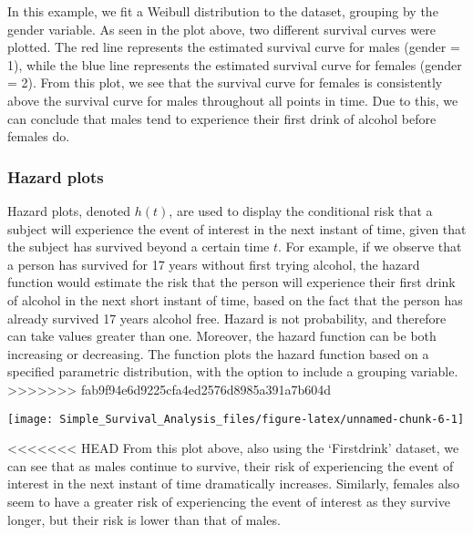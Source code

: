 In this example, we fit a Weibull distribution to the 
dataset, grouping by the gender variable. As seen in the plot above, two
different survival curves were plotted. The red line represents the
estimated survival curve for males (gender = 1), while the blue line
represents the estimated survival curve for females (gender = 2). From
this plot, we see that the survival curve for females is consistently
above the survival curve for males throughout all points in time. Due to
this, we can conclude that males tend to experience their first drink of
alcohol before females do.

\hypertarget{hazard-plots-1}{%
\subsubsection{Hazard plots}\label{hazard-plots-1}}

Hazard plots, denoted \(h(t)\), are used to display the conditional risk
that a subject will experience the event of interest in the next instant
of time, given that the subject has survived beyond a certain time
\(t\). For example, if we observe that a person has survived for 17
years without first trying alcohol, the hazard function would estimate
the risk that the person will experience their first drink of alcohol in
the next short instant of time, based on the fact that the person has
already survived 17 years alcohol free. Hazard is not probability, and
therefore can take values greater than one. Moreover, the hazard
function can be both increasing or decreasing. The 
function plots the hazard function based on a specified parametric
distribution, with the option to include a grouping variable.
\textgreater{}\textgreater{}\textgreater{}\textgreater{}\textgreater{}\textgreater{}\textgreater{}
fab9f94e6d9225cfa4ed2576d8985a391a7b604d

\begin{Schunk}

\texttt{[image: Simple\_Survival\_Analysis\_files/figure-latex/unnamed-chunk-6-1]} \end{Schunk}

\textless{}\textless{}\textless{}\textless{}\textless{}\textless{}\textless{}
HEAD From this plot above, also using the `Firstdrink' dataset, we can
see that as males continue to survive, their risk of experiencing the
event of interest in the next instant of time dramatically increases.
Similarly, females also seem to have a greater risk of experiencing the
event of interest as they survive longer, but their risk is lower than
that of males.

